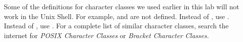 \begin{warn}
Some of the definitions for character classes we used earlier in this lab will not work in the Unix Shell. For example, \li{\\w} and \li{\\d} are not defined. Instead of \li{\\w}, use \li{[[:alnum:]]}. Instead of \li{\\d}, use \li{[[:digit:]]}. For a complete list of similar character classes, search the internet for \emph{POSIX Character Classes} or \emph{Bracket Character Classes.}
\end{warn}

